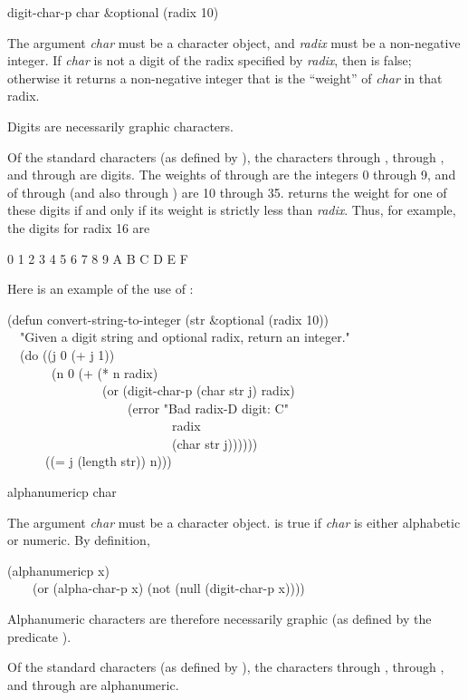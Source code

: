 \begin{defun}[Function]
digit-char-p char &optional (radix 10)

The argument {\it char} must be a character object,
and {\it radix} must be a non-negative integer.
If {\it char} is not a digit of the radix
specified by {\it radix}, then  is
false; otherwise it returns
a non-negative integer that is the ``weight'' of {\it char} in that radix.

Digits are necessarily graphic characters.

Of the standard characters (as defined by ),
the characters  through ,  through ,
and  through 
are digits.  The weights of  through  are the integers 0 through 9,
and of  through  (and also  through ) are 10 through 35.
 returns the weight for one of these digits if and only if
its weight is strictly less than {\it radix}.  Thus, for example,
the digits for radix 16 are
\begin{lisp}
0  1  2  3  4  5  6  7  8  9  A  B  C  D  E  F
\end{lisp}

Here is an example of the use of :
\begin{lisp}
(defun convert-string-to-integer (str \&optional (radix 10)) \\
~~"Given a digit string and optional radix, return an integer." \\
~~(do ((j 0 (+ j 1)) \\
~~~~~~~(n 0 (+ (* n radix) \\
~~~~~~~~~~~~~~~(or (digit-char-p (char str j) radix) \\
~~~~~~~~~~~~~~~~~~~(error "Bad radix-{\Xtilde}D digit: {\Xtilde}C" \\
~~~~~~~~~~~~~~~~~~~~~~~~~~radix \\
~~~~~~~~~~~~~~~~~~~~~~~~~~(char str j)))))) \\
~~~~~~((= j (length str)) n)))
\end{lisp}
\end{defun}

\begin{defun}[Function]
alphanumericp char

The argument {\it char} must be a character object.
 is true if {\it char} is either alphabetic
or numeric.  By definition,
\begin{lisp}
(alphanumericp x) \\
~~~\EQ\ (or (alpha-char-p x) (not (null (digit-char-p x))))
\end{lisp}
Alphanumeric characters are therefore necessarily graphic
(as defined by the predicate ).

Of the standard characters (as defined by ),
the characters  through ,  through ,
and  through  are alphanumeric.
\end{defun}


